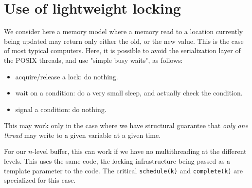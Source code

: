 \documentclass[10pt]{article}
\def\code#1{\texttt{#1}}
\begin{document}
\section{Use of lightweight locking}

We consider here a memory model where a memory read to a location currently
being updated may return only either the old, or the new value. This is
the case of most typical computers. Here, it is possible to avoid the
serialization layer of the POSIX threads, and use "simple busy waits", as
follows:
\begin{itemize}
    \item acquire/release a lock: do nothing.
    \item wait on a condition: do a very small sleep, and actually check
        the condition.
    \item signal a condition: do nothing.
\end{itemize}

This may work only in the case where we have structural guarantee that
\emph{only one thread} may write to a given variable at a given time.

For our $n$-level buffer, this can work if we have no multithreading at
the different levels. This uses the same code, the locking infrastructure
being passed as a template parameter to the code. The critical
\code{schedule(k)} and \code{complete(k)} are specialized for this case.
\end{document}
